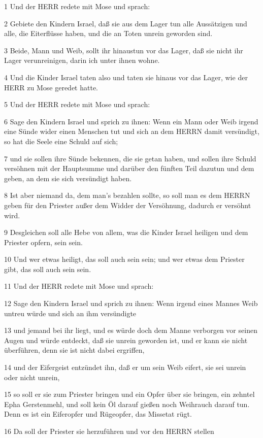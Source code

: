 \par 1 Und der HERR redete mit Mose und sprach:
\par 2 Gebiete den Kindern Israel, daß sie aus dem Lager tun alle Aussätzigen und alle, die Eiterflüsse haben, und die an Toten unrein geworden sind.
\par 3 Beide, Mann und Weib, sollt ihr hinaustun vor das Lager, daß sie nicht ihr Lager verunreinigen, darin ich unter ihnen wohne.
\par 4 Und die Kinder Israel taten also und taten sie hinaus vor das Lager, wie der HERR zu Mose geredet hatte.
\par 5 Und der HERR redete mit Mose und sprach:
\par 6 Sage den Kindern Israel und sprich zu ihnen: Wenn ein Mann oder Weib irgend eine Sünde wider einen Menschen tut und sich an dem HERRN damit versündigt, so hat die Seele eine Schuld auf sich;
\par 7 und sie sollen ihre Sünde bekennen, die sie getan haben, und sollen ihre Schuld versöhnen mit der Hauptsumme und darüber den fünften Teil dazutun und dem geben, an dem sie sich versündigt haben.
\par 8 Ist aber niemand da, dem man's bezahlen sollte, so soll man es dem HERRN geben für den Priester außer dem Widder der Versöhnung, dadurch er versöhnt wird.
\par 9 Desgleichen soll alle Hebe von allem, was die Kinder Israel heiligen und dem Priester opfern, sein sein.
\par 10 Und wer etwas heiligt, das soll auch sein sein; und wer etwas dem Priester gibt, das soll auch sein sein.
\par 11 Und der HERR redete mit Mose und sprach:
\par 12 Sage den Kindern Israel und sprich zu ihnen: Wenn irgend eines Mannes Weib untreu würde und sich an ihm versündigte
\par 13 und jemand bei ihr liegt, und es würde doch dem Manne verborgen vor seinen Augen und würde entdeckt, daß sie unrein geworden ist, und er kann sie nicht überführen, denn sie ist nicht dabei ergriffen,
\par 14 und der Eifergeist entzündet ihn, daß er um sein Weib eifert, sie sei unrein oder nicht unrein,
\par 15 so soll er sie zum Priester bringen und ein Opfer über sie bringen, ein zehntel Epha Gerstenmehl, und soll kein Öl darauf gießen noch Weihrauch darauf tun. Denn es ist ein Eiferopfer und Rügeopfer, das Missetat rügt.
\par 16 Da soll der Priester sie herzuführen und vor den HERRN stellen
